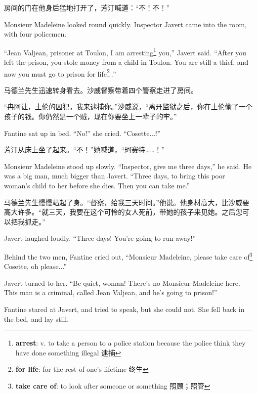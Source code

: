 \documentclass[fontset=ubuntu, zihao=5]{ctexart}
\begin{document}
\begin{paracol}{2}
  \switchcolumn

  房间的门在他身后猛地打开了，芳汀喊道：“不！不！”

  \switchcolumn*

  Monsieur Madeleine looked round quickly. Inspector Javert came into the room, with four policemen.


  ``Jean Valjean, prisoner at Toulon, I am arresting\footnote{\textbf{arrest}:  v. to take a person to a police station because the police think they have done something illegal 逮捕}
  you,'' Javert said. ``After you left the prison, you stole money from a child in Toulon. You are still a thief, and now you must go to prison for life\footnote{\textbf{for life}: for the rest of one's lifetime 终生}
  .''

  \switchcolumn

  马德兰先生迅速转身看去。沙威督察带着四个警察走进了房间。


  “冉阿让，土伦的囚犯，我来逮捕你。”沙威说，“离开监狱之后，你在土伦偷了一个孩子的钱。你仍然是一个贼，现在你要坐上一辈子的牢。”

  \switchcolumn*

  Fantine sat up in bed. ``No!'' she cried. ``Cosette...!''

  \switchcolumn

  芳汀从床上坐了起来。“不！”她喊道，“珂赛特……！”

  \switchcolumn*

  Monsieur Madeleine stood up slowly. ``Inspector, give me three days,'' he said. He was a big man, much bigger than Javert. ``Three days, to bring this poor woman's child to her before she dies. Then you can take me.''

  \switchcolumn

  马德兰先生慢慢站起了身。“督察，给我三天时间。”他说。他身材高大，比沙威要高大许多。“就三天，我要在这个可怜的女人死前，带她的孩子来见她。之后您可以把我抓走。”

  \switchcolumn*

  Javert laughed loudly. ``Three days! You're going to run away!''

  Behind the two men, Fantine cried out, ``Monsieur Madeleine, please take
  care of\footnote{\textbf{take care of}: to look after someone or something
    照顾；照管} Cosette, oh please...''

  Javert turned to her. ``Be quiet, woman! There's no Monsieur Madeleine here. This man is a criminal, called Jean Valjean, and he's going to prison!''

  Fantine stared at Javert, and tried to speak, but she could not. She fell back in the bed, and lay still.


\end{paracol}
\end{document}
